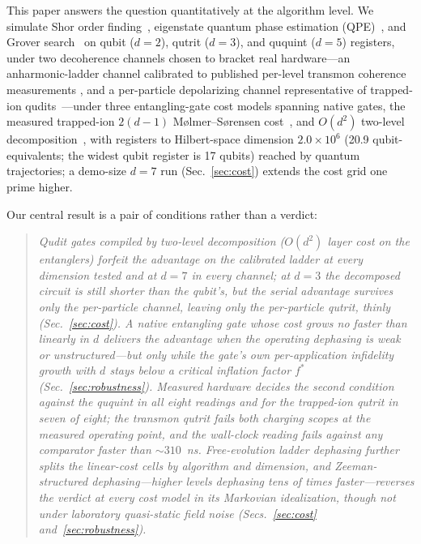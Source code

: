 \documentclass[aps,pra,reprint,superscriptaddress,nofootinbib,floatfix]{revtex4-2}
\begin{document}
This paper answers the question quantitatively at the algorithm level.
We simulate Shor order finding~\cite{shor1997}, eigenstate quantum
phase estimation (QPE)~\cite{kitaev1995}, and Grover
search~\cite{grover1996} on qubit ($d=2$), qutrit ($d=3$), and ququint
($d=5$) registers, under two decoherence channels chosen to bracket real
hardware---an anharmonic-ladder channel calibrated to published
per-level transmon coherence measurements
\cite{peterer2015,goss2022,blok2021,tripathi2025,wang2025}, and a
per-particle depolarizing channel representative of trapped-ion
qudits~\cite{ringbauer2022,low2023}---under three entangling-gate cost
models spanning native gates, the measured trapped-ion
$2(d{-}1)$ M{\o}lmer--S{\o}rensen cost~\cite{ringbauer2022}, and
$O(d^2)$ two-level decomposition~\cite{pavlidis2021}, with registers
to Hilbert-space dimension $2.0\times10^{6}$ (20.9 qubit-equivalents; the
widest qubit register is 17 qubits) reached by quantum
trajectories; a demo-size $d=7$ run (Sec.~\ref{sec:cost}) extends the
cost grid one prime higher.

Our central result is a pair of conditions rather than a verdict:

\begin{quote}
\emph{Qudit gates compiled by two-level decomposition ($O(d^2)$ layer
cost on the entanglers) forfeit the advantage on the
calibrated ladder at every dimension tested and at $d=7$ in every
channel; at $d=3$ the
decomposed circuit is still shorter than the qubit's, but the serial
advantage survives only the per-particle channel,
leaving only the per-particle qutrit, thinly
(Sec.~\ref{sec:cost}). A native entangling gate whose cost grows no
faster than linearly in $d$ delivers the advantage when the operating
dephasing is weak or unstructured---but only while the gate's own
per-application infidelity growth with $d$ stays below a critical
inflation factor $f^\ast$ (Sec.~\ref{sec:robustness}). Measured
hardware decides the second condition against the ququint in all
eight readings and \emph{for} the trapped-ion qutrit in seven of
eight; the transmon qutrit fails both charging scopes at the
measured operating point, and the wall-clock reading fails against
any comparator faster than ${\sim}310$~ns.
Free-evolution
ladder dephasing further splits the linear-cost cells by algorithm and
dimension, and Zeeman-structured dephasing---higher levels
dephasing tens of times faster---reverses the verdict at every cost
model in its Markovian idealization, though not under laboratory
quasi-static field noise (Secs.~\ref{sec:cost}
and~\ref{sec:robustness}).}
\end{quote}
\end{document}
